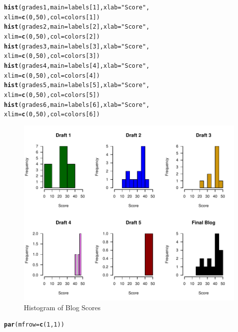 \documentclass{article}\usepackage[]{graphicx}\usepackage[]{color}
\makeatletter
\def\maxwidth{ %
  \ifdim\Gin@nat@width>\linewidth
    \linewidth
  \else
    \Gin@nat@width
  \fi
}
\newcommand{\hlnum}[1]{\textcolor[rgb]{0.686,0.059,0.569}{#1}}%
\newcommand{\hlstr}[1]{\textcolor[rgb]{0.192,0.494,0.8}{#1}}%
\newcommand{\hlstd}[1]{\textcolor[rgb]{0.345,0.345,0.345}{#1}}%
\newcommand{\hlkwc}[1]{\textcolor[rgb]{0.333,0.667,0.333}{#1}}%
\newcommand{\hlkwd}[1]{\textcolor[rgb]{0.737,0.353,0.396}{\textbf{#1}}}%
\newenvironment{kframe}{%
 \def\at@end@of@kframe{}%
 \ifinner\ifhmode%
  \def\at@end@of@kframe{\end{minipage}}%
  \begin{minipage}{\columnwidth}%
 \fi\fi%
 \def\FrameCommand##1{\hskip\@totalleftmargin \hskip-\fboxsep
 \colorbox{shadecolor}{##1}\hskip-\fboxsep
     \hskip-\linewidth \hskip-\@totalleftmargin \hskip\columnwidth}%
 \MakeFramed {\advance\hsize-\width
   \@totalleftmargin\z@ \linewidth\hsize
   \@setminipage}}%
 {\par\unskip\endMakeFramed%
 \at@end@of@kframe}
\newenvironment{knitrout}{}{} %
\makeatother
\begin{document}
\begin{knitrout}
\begin{kframe}
\begin{alltt}
\hlkwd{hist}\hlstd{(grades1,} \hlkwc{main}\hlstd{=labels[}\hlnum{1}\hlstd{],} \hlkwc{xlab}\hlstd{=}\hlstr{"Score"}\hlstd{,}
     \hlkwc{xlim}\hlstd{=}\hlkwd{c}\hlstd{(}\hlnum{0}\hlstd{,}\hlnum{50}\hlstd{),} \hlkwc{col}\hlstd{=colors[}\hlnum{1}\hlstd{])}
\hlkwd{hist}\hlstd{(grades2,} \hlkwc{main}\hlstd{=labels[}\hlnum{2}\hlstd{],} \hlkwc{xlab}\hlstd{=}\hlstr{"Score"}\hlstd{,}
     \hlkwc{xlim}\hlstd{=}\hlkwd{c}\hlstd{(}\hlnum{0}\hlstd{,}\hlnum{50}\hlstd{),} \hlkwc{col}\hlstd{=colors[}\hlnum{2}\hlstd{])}
\hlkwd{hist}\hlstd{(grades3,} \hlkwc{main}\hlstd{=labels[}\hlnum{3}\hlstd{],} \hlkwc{xlab}\hlstd{=}\hlstr{"Score"}\hlstd{,}
     \hlkwc{xlim}\hlstd{=}\hlkwd{c}\hlstd{(}\hlnum{0}\hlstd{,}\hlnum{50}\hlstd{),} \hlkwc{col}\hlstd{=colors[}\hlnum{3}\hlstd{])}
\hlkwd{hist}\hlstd{(grades4,} \hlkwc{main}\hlstd{=labels[}\hlnum{4}\hlstd{],} \hlkwc{xlab}\hlstd{=}\hlstr{"Score"}\hlstd{,}
     \hlkwc{xlim}\hlstd{=}\hlkwd{c}\hlstd{(}\hlnum{0}\hlstd{,}\hlnum{50}\hlstd{),} \hlkwc{col}\hlstd{=colors[}\hlnum{4}\hlstd{])}
\hlkwd{hist}\hlstd{(grades5,} \hlkwc{main}\hlstd{=labels[}\hlnum{5}\hlstd{],} \hlkwc{xlab}\hlstd{=}\hlstr{"Score"}\hlstd{,}
     \hlkwc{xlim}\hlstd{=}\hlkwd{c}\hlstd{(}\hlnum{0}\hlstd{,}\hlnum{50}\hlstd{),} \hlkwc{col}\hlstd{=colors[}\hlnum{5}\hlstd{])}
\hlkwd{hist}\hlstd{(grades6,} \hlkwc{main}\hlstd{=labels[}\hlnum{6}\hlstd{],} \hlkwc{xlab}\hlstd{=}\hlstr{"Score"}\hlstd{,}
     \hlkwc{xlim}\hlstd{=}\hlkwd{c}\hlstd{(}\hlnum{0}\hlstd{,}\hlnum{50}\hlstd{),} \hlkwc{col}\hlstd{=colors[}\hlnum{6}\hlstd{])}
\end{alltt}
\end{kframe}\begin{figure}
\includegraphics[width=\maxwidth]{figure/scoreshist-1} \caption[Histogram of Blog Scores]{Histogram of Blog Scores}\label{fig:scoreshist}
\end{figure}

\begin{kframe}\begin{alltt}
\hlkwd{par}\hlstd{(}\hlkwc{mfrow}\hlstd{=}\hlkwd{c}\hlstd{(}\hlnum{1}\hlstd{,}\hlnum{1}\hlstd{))}
\end{alltt}
\end{kframe}
\end{knitrout}
\end{document}
